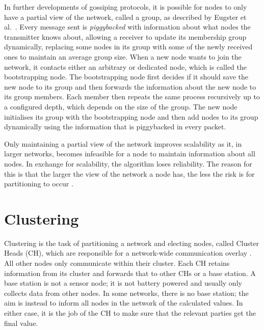 \begin{newtext}
In further developments of gossiping protocols, it is possible for nodes to only have a partial view of the network, called a group, as described by Eugster et al.~\cite{Eugster2004-epidemic-information-dissemination-in-distributed-systems}. Every message sent is \emph{piggybacked} with information about what nodes the transmitter knows about, allowing a receiver to update its membership group dynamically, replacing some nodes in its group with some of the newly received ones to maintain an average group size. When a new node wants to join the network, it contacts either an arbitrary or dedicated node, which is called the bootstrapping node. The bootstrapping node first decides if it should save the new node to its group and then forwards the information about the new node to its group members. Each member then repeats the same process recursively up to a configured depth, which depends on the size of the group. The new node initialises its group with the bootstrapping node and then add nodes to its group dynamically using the information that is piggybacked in every packet.

Only maintaining a partial view of the network improves scalability as it, in larger networks, becomes infeasible for a node to maintain information about all nodes. In exchange for scalability, the algorithm loses reliability. The reason for this is that the larger the view of the network a node has, the less the risk is for partitioning to occur  \cite{Eugster2004-epidemic-information-dissemination-in-distributed-systems}.


\end{newtext}

\section{Clustering}
\label{sec:background:clustering}
Clustering is the task of partitioning a network and electing nodes, called Cluster Heads (CH), which are responsible for a network-wide communication overlay \cite{Younis2006-clustering-survey}. All other nodes only communicate within their cluster. Each CH retains information from its cluster and forwards that to other CHs or a base station. A base station is not a sensor node; it is not battery powered and usually only collects data from other nodes. In some networks, there is no base station; the aim is instead to inform all nodes in the network of the calculated values. In either case, it is the job of the CH to make sure that the relevant parties get the final value.

